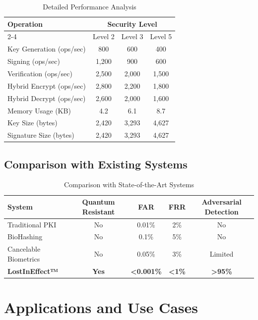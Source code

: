 \documentclass[12pt,a4paper]{article}
\begin{document}
\begin{table}[H]
\centering
\caption{Detailed Performance Analysis}
\begin{tabular}{@{}lccc@{}}
\toprule
\multirow{2}{*}{Operation} & \multicolumn{3}{c}{Security Level} \\
\cmidrule(l){2-4}
& Level 2 & Level 3 & Level 5 \\
\midrule
Key Generation (ops/sec) & 800 & 600 & 400 \\
Signing (ops/sec) & 1,200 & 900 & 600 \\
Verification (ops/sec) & 2,500 & 2,000 & 1,500 \\
Hybrid Encrypt (ops/sec) & 2,800 & 2,200 & 1,800 \\
Hybrid Decrypt (ops/sec) & 2,600 & 2,000 & 1,600 \\
\midrule
Memory Usage (KB) & 4.2 & 6.1 & 8.7 \\
Key Size (bytes) & 2,420 & 3,293 & 4,627 \\
Signature Size (bytes) & 2,420 & 3,293 & 4,627 \\
\bottomrule
\end{tabular}
\label{tab:detailed_performance}
\end{table}

\subsection{Comparison with Existing Systems}

\begin{table}[H]
\centering
\caption{Comparison with State-of-the-Art Systems}
\begin{tabular}{@{}lcccc@{}}
\toprule
System & Quantum Resistant & FAR & FRR & Adversarial Detection \\
\midrule
Traditional PKI & No & 0.01\% & 2\% & No \\
BioHashing \cite{jin2004biohashing} & No & 0.1\% & 5\% & No \\
Cancelable Biometrics \cite{ratha2001cancelable} & No & 0.05\% & 3\% & Limited \\
\textbf{LostInEffect™} & \textbf{Yes} & \textbf{<0.001\%} & \textbf{<1\%} & \textbf{>95\%} \\
\bottomrule
\end{tabular}
\label{tab:comparison}
\end{table}

\section{Applications and Use Cases}
\end{document}
